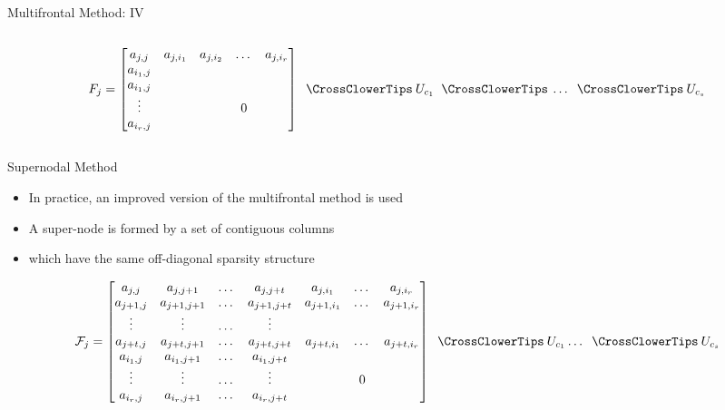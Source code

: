 \begin{frame}[t]{Multifrontal Method: IV}
\begin{columns}
	\begin{column}{0.75\textwidth}
		\begin{equation} \label{eq:mm-9}
			F_{j} = \begin{bmatrix}a_{j,j} & a_{j,i_1} & a_{j,i_2} & \dots & a_{j,i_r} \\
			a_{i_1,j} \\
			a_{i_1,j} \\
			\vdots & & & 0\\
			a_{i_r,j} \\
			\end{bmatrix} \extendadd U_{c_1} \extendadd \dots \extendadd U_{c_s} 
		\end{equation}
	\end{column}

	\end{columns}
\end{frame}



\begin{frame}[t]{Supernodal Method}
	\small
	
	\begin{itemize}
		\item In practice, an improved version of the multifrontal method is used
		\item A super-node is formed by a set of contiguous columns 
		
		\item which have the same  off-diagonal sparsity structure
	\end{itemize}

	\begin{equation} \label{eq:mm-10}
		\mathcal{F}_{j} = \begin{bmatrix}a_{j,j} & a_{j,j+1} & \dots & a_{j,j+t}  & a_{j,i_1} & \dots & a_{j,i_r} \\
		a_{j+1,j} & a_{j+1,j+1} & \dots & a_{j+1,j+t}  & a_{j+1,i_1} & \dots & a_{j+1,i_r} \\
		\vdots & \vdots & \dots & \vdots \\
		a_{j+t,j}  & a_{j+t,j+1} & \dots & a_{j+t,j+t}  & a_{j+t,i_1} & \dots & a_{j+t,i_r} \\
		a_{i_1,j} & a_{i_1,j+1} & \dots & a_{i_1,j+t} \\
		\vdots & \vdots & \dots & \vdots  & & 0\\ 
		a_{i_r,j} & a_{i_r,j+1} & \dots & a_{i_r,j+t} \\
		\end{bmatrix} \extendadd U_{c_1} \dots \extendadd U_{c_s} 
	\end{equation}

\end{frame}